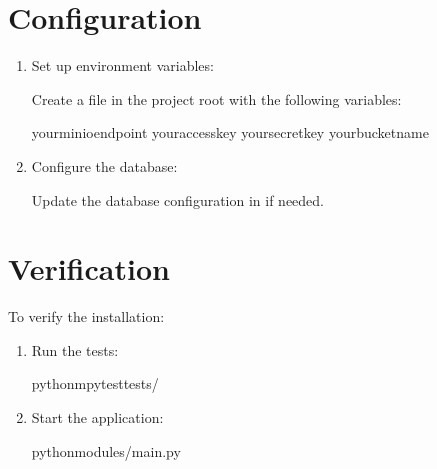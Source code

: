 \documentclass[letterpaper,10pt,english]{sphinxmanual}
\begin{document}
\section{Configuration}
\label{\detokenize{installation:configuration}}\begin{enumerate}
%
\item {} 
\sphinxAtStartPar
Set up environment variables:

\sphinxAtStartPar
Create a  file in the project root with the following variables:

\begin{sphinxVerbatim}[commandchars=\\\{\}]
your\PYGZus{}minio\PYGZus{}endpoint
your\PYGZus{}access\PYGZus{}key
your\PYGZus{}secret\PYGZus{}key
your\PYGZus{}bucket\PYGZus{}name
\end{sphinxVerbatim}

\item {} 
\sphinxAtStartPar
Configure the database:

\sphinxAtStartPar
Update the database configuration in  if needed.

\end{enumerate}


\section{Verification}
\label{\detokenize{installation:verification}}
\sphinxAtStartPar
To verify the installation:
\begin{enumerate}
%
\item {} 
\sphinxAtStartPar
Run the tests:

\begin{sphinxVerbatim}[commandchars=\\\{\}]
python\PYGZhy{}mpytesttests/
\end{sphinxVerbatim}

\item {} 
\sphinxAtStartPar
Start the application:

\begin{sphinxVerbatim}[commandchars=\\\{\}]
pythonmodules/main.py
\end{sphinxVerbatim}

\end{enumerate}
\end{document}
